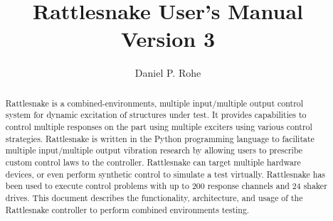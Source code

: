 \documentclass[pdf,12pt,report]{SANDreport}
\title{Rattlesnake User's Manual\\Version 3}
\author{Daniel P. Rohe}        %
\date{}        %
\begin{document}
    \maketitle

    \begin{abstract}
        Rattlesnake is a combined-environments, multiple input/multiple output control system for dynamic excitation of structures under test.  It provides capabilities to control multiple responses on the part using multiple exciters using various control strategies.  Rattlesnake is written in the Python programming language to facilitate multiple input/multiple output vibration research by allowing users to prescribe custom control laws to the controller.  Rattlesnake can target multiple hardware devices, or even perform synthetic control to simulate a test virtually.  Rattlesnake has been used to execute control problems with up to 200 response channels and 24 shaker drives.  This document describes the functionality, architecture, and usage of the Rattlesnake controller to perform combined environments testing.
    \end{abstract}


%    

    \cleardoublepage        %
    \tableofcontents
    \listoffigures
    \listoftables




\end{document}
